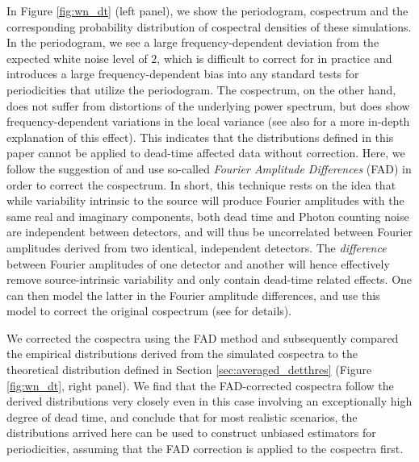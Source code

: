 \documentclass[12pt]{emulateapj}
\begin{document}
\begin{bf}
In Figure \ref{fig:wn_dt} (left panel), we show the periodogram, cospectrum and the corresponding probability distribution of cospectral densities of these simulations. In the periodogram, we see a large frequency-dependent deviation from the expected white noise level of $2$, which is difficult to correct for in practice and introduces a large frequency-dependent bias into any standard tests for periodicities that utilize the periodogram. The cospectrum, on the other hand, does not suffer from distortions of the underlying power spectrum, but does show frequency-dependent variations in the local variance (see also \citet{Bachetti+15} for a more in-depth explanation of this effect). 
This indicates that the distributions defined in this paper cannot be applied to dead-time affected data without correction. Here, we follow the suggestion of \citet{bachetti2017} and use so-called \textit{Fourier Amplitude Differences} (FAD) in order to correct the cospectrum. In short, this technique rests on the idea that while variability intrinsic to the source will produce Fourier amplitudes with the same real and imaginary components, both dead time and Photon counting noise are independent between detectors, and will thus be uncorrelated between Fourier amplitudes derived from two identical, independent detectors. The \textit{difference} between Fourier amplitudes of one detector and another will hence effectively remove source-intrinsic variability and only contain dead-time related effects. One can then model the latter in the Fourier amplitude differences, and use this model to correct the original cospectrum (see \citet{bachetti2017} for details).

We corrected the cospectra using the FAD method and subsequently compared the empirical distributions derived from the simulated cospectra to the theoretical distribution defined in Section \ref{sec:averaged_detthres} (Figure \ref{fig:wn_dt}, right panel). We find that the FAD-corrected cospectra follow the derived distributions very closely even in this case involving an exceptionally high degree of dead time, and conclude that for most realistic scenarios, the distributions arrived here can be used to construct unbiased estimators for periodicities, assuming that the FAD correction is applied to the cospectra first.

\end{bf}
\end{document}

